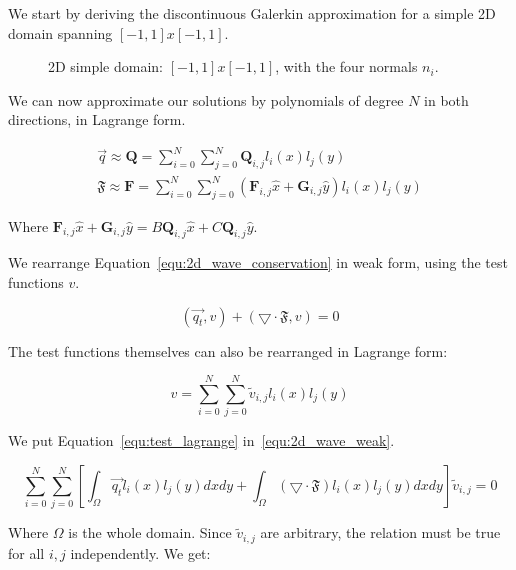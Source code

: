 We start by deriving the discontinuous Galerkin approximation for a simple 2D domain spanning
$\left[ -1, 1 \right] x \left[ -1, 1 \right]$.

\begin{figure}[H]
	\centering
	
	\caption{2D simple domain: $\left[ -1, 1 \right] x \left[ -1, 1 \right]$, with the four normals $n_i$.}
	\label{fig:simple_domain}
\end{figure}

We can now approximate our solutions by polynomials of degree $N$ in both directions, in Lagrange
form. 

\begin{gather}
	\overrightarrow{q} \approx \mathbf{Q} = \sum_{i = 0}^{N}\sum_{j = 0}^{N}\mathbf{Q}_{i,j}l_i(x)l_j(y) \\
	\mathfrak{F} \approx \mathbf{F} = \sum_{i = 0}^{N} \sum_{j = 0}^{N} \left ( \mathbf{F}_{i, j} \widehat{x} + \mathbf{G}_{i, j}\widehat{y}\right ) l_i(x) l_j(y)
\end{gather}

Where $\mathbf{F}_{i, j} \widehat{x} + \mathbf{G}_{i, j}\widehat{y} = B \mathbf{Q}_{i, j}\widehat{x}
+ C \mathbf{Q}_{i, j}\widehat{y}$. 

We rearrange Equation~\ref{equ:2d_wave_conservation} in weak form, using the test functions $v$.

\begin{equation} \label{equ:2d_wave_weak}
	\left( \overrightarrow{q_t}, v \right) + \left( \bigtriangledown \cdot \mathfrak{F}, v \right) = 0
\end{equation}

The test functions themselves can also be rearranged in Lagrange form:

\begin{equation} \label{equ:test_lagrange}
	v = \sum^{N}_{i = 0}\sum_{j = 0}^{N}\widetilde{v}_{i, j}l_i(x)l_j(y)
\end{equation}

We put Equation~\ref{equ:test_lagrange} in~\ref{equ:2d_wave_weak}.

\begin{equation}
	\sum_{i = 0}^{N}\sum_{j = 0}^{N} \left[ \int_{\Omega }\overrightarrow{q_t} l_i(x) l_j(y) dx dy + \int_{\Omega } \left( \bigtriangledown \cdot \mathfrak{F} \right) l_i(x) l_j(y) dx dy \right] \widetilde{v}_{i, j} = 0
\end{equation}

Where $\Omega$ is the whole domain. Since $\widetilde{v}_{i, j}$ are arbitrary, the relation must be
true for all $i,j$ independently. We get:

